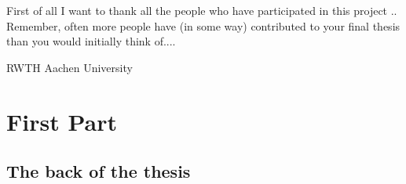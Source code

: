 \documentclass[a4paper,11pt]{MScThesis}
\begin{document}
    \cleardoublepage
%
    First of all I want to thank all the people who have participated in this project ..
    Remember, often more people have (in some way) contributed to your final thesis than you would initially think of....
    \vspace*{15mm}

    \noindent
    RWTH Aachen University \hfill \mscname\\ %
    \mscdate

%
    \tocloflot
%
    \printnomencl %
%
    \begin{acronym}%
    \end{acronym}%
    \cleardoublepage%
%
%
%
\mainmatter
%

\cleardoublepage

%
    \part{First Part} %
		




%
    


\appendix

    \chapter{The back of the thesis}
\end{document}
